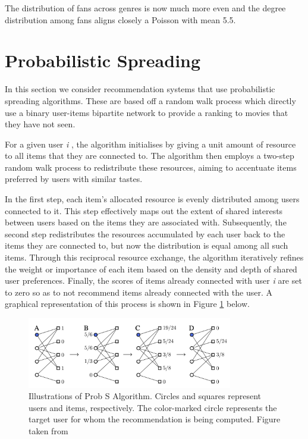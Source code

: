\documentclass[12pt]{article}
\numberwithin{equation}{section}
\begin{document}
The distribution of fans across genres is now much more even and the degree distribution among fans aligns closely a Poisson with mean 5.5.

\section{Probabilistic Spreading}

In this section we consider recommendation systems that use probabilistic spreading algorithms. These are based off a random walk process which directly use a binary user-items bipartite network to provide a ranking to movies that they have not seen.

For a given user \textit{i} , the algorithm initialises by giving a unit amount of resource to all items that they are connected to. The algorithm then employs a two-step random walk process to redistribute these resources, aiming to accentuate items preferred by users with similar tastes.

In the first step, each item's allocated resource is evenly distributed among users connected to it. This step effectively maps out the extent of shared interests between users based on the items they are associated with. Subsequently, the second step redistributes the resources accumulated by each user back to the items they are connected to, but now the distribution is equal among all such items. Through this reciprocal resource exchange, the algorithm iteratively refines the weight or importance of each item based on the density and depth of shared user preferences. Finally, the scores of items already connected with user \textit{i} are set to zero so as to not recommend items already connected with the user. A graphical representation of this process is shown in Figure \ref{figure:Prob S} below.

\begin{figure}[!ht]
\centering 
\includegraphics[width=0.8\textwidth]{Prob S algorithm}
\caption{Illustrations of Prob S Algorithm. Circles and squares represent users and items, respectively. The color-marked circle represents the target user for whom the recommendation is being computed. Figure taken from \cite{YU2016192}}
\label{figure:Prob S}
\end{figure}
\end{document}
